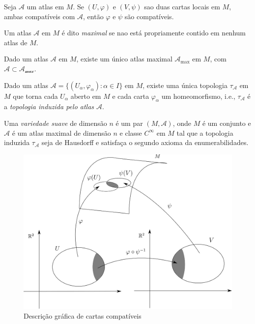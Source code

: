 \begin{lema}
	Seja $\mathcal{A}$ um atlas em $M$. Se $(U, \varphi)$ e $(V, \psi)$ sao duas cartas locais em $M$, ambas compatíveis com $\mathcal{A}$, então $\varphi$ e $\psi$ são compatíveis.
\end{lema}

\begin{defi}
	Um atlas $\mathcal{A}$ em $M$ é dito \emph{maximal} se nao está propriamente contido em nenhum atlas de $M$.
\end{defi}

\begin{lema}
	Dado um atlas $\mathcal{A}$ em $M$, existe um único atlas maximal $\mathcal{A}_{\text{max}}$ em $M$, com $\mathcal{A} \subset \mathcal{A_{\text{max}}}$.
\end{lema}

\begin{lema}
	Dado um atlas $\mathcal{A} = \{ (U_{\alpha}, \varphi_{\alpha}): \alpha \in I \}$ em $M$, existe uma única topologia $\tau_{\mathcal{A}}$ em $M$ que torna cada $U_{\alpha}$ aberto em $M$ e cada carta $\varphi_{\alpha}$ um homeomorfismo, i.e., $\tau_{\mathcal{A}}$ é a \emph{topologia induzida pelo atlas $\mathcal{A}$}.
\end{lema}

\begin{defi}
	Uma \emph{variedade suave} de dimensão $n$ é um par $(M, \mathcal{A})$, onde $M$ é um conjunto e $\mathcal{A}$ é um atlas maximal de dimensão $n$ e classe $C^{\infty}$ em $M$ tal que a topologia induzida $\tau_{\mathcal{A}}$ seja de Hausdorff e satisfaça o segundo axioma da enumerabilidades.
\end{defi}

\begin{figure}
	\centering
	\includegraphics[scale=0.5]{graficos/cartas_compativeis.eps}
	\caption{Descrição gráfica de cartas compatíveis}
\end{figure}

